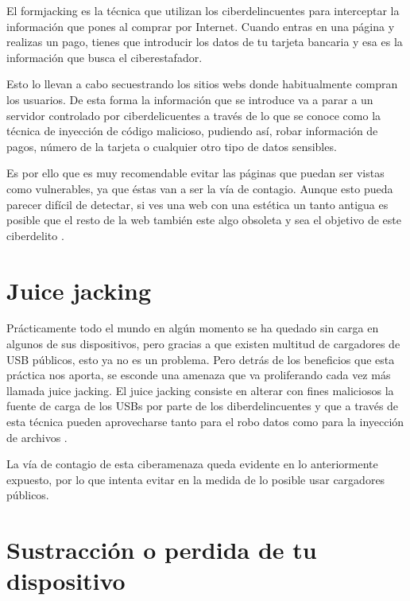 \documentclass[
  spanish,
  a4paper,
  openany]{book}
\begin{document}
El formjacking es la técnica que utilizan los ciberdelincuentes para interceptar la información que pones al comprar por Internet. Cuando entras en una página y realizas un pago, tienes que introducir los datos de tu tarjeta bancaria y esa es la información que busca el ciberestafador.

Esto lo llevan a cabo secuestrando los sitios webs donde habitualmente compran los usuarios. De esta forma la información que se introduce va a parar a un servidor controlado por ciberdelicuentes a través de lo que se conoce como la técnica de inyección de código malicioso, pudiendo así, robar información de pagos, número de la tarjeta o cualquier otro tipo de datos sensibles.

Es por ello que es muy recomendable evitar las páginas que puedan ser vistas como vulnerables, ya que éstas van a ser la vía de contagio. Aunque esto pueda parecer difícil de detectar, si ves una web con una estética un tanto antigua es posible que el resto de la web también este algo obsoleta y sea el objetivo de este ciberdelito \citep{RZ-formjacking}.

\hypertarget{juice-jacking}{%
\section{Juice jacking}\label{juice-jacking}}

Prácticamente todo el mundo en algún momento se ha quedado sin carga en algunos de sus dispositivos, pero gracias a que existen multitud de cargadores de USB públicos, esto ya no es un problema. Pero detrás de los beneficios que esta práctica nos aporta, se esconde una amenaza que va proliferando cada vez más llamada juice jacking. El juice jacking consiste en alterar con fines maliciosos la fuente de carga de los USBs por parte de los diberdelincuentes y que a través de esta técnica pueden aprovecharse tanto para el robo datos como para la inyección de archivos \citep{ESET-juice-jacking}.

La vía de contagio de esta ciberamenaza queda evidente en lo anteriormente expuesto, por lo que intenta evitar en la medida de lo posible usar cargadores públicos.

\hypertarget{sustracciuxf3n-o-perdida-de-tu-dispositivo}{%
\section{Sustracción o perdida de tu dispositivo}\label{sustracciuxf3n-o-perdida-de-tu-dispositivo}}
\end{document}
